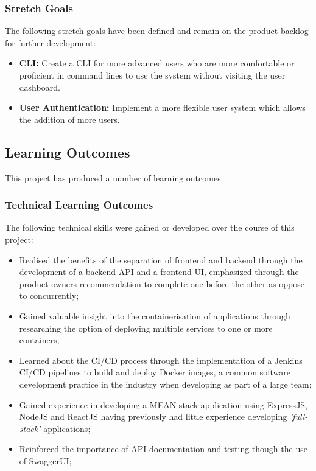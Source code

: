   \subsubsection{Stretch Goals}
  The following stretch goals have been defined and remain on the product backlog for further development:
  
  \begin{itemize}
    \item \textbf{CLI:} Create a CLI for more advanced users who are more comfortable or proficient in command lines to use the system without visiting the user dashboard.
    \item \textbf{User Authentication: } Implement a more flexible user system which allows the addition of more users.
  \end{itemize}
  

	\subsection{Learning Outcomes}
  This project has produced a number of learning outcomes.
  
  \subsubsection{Technical Learning Outcomes}
  The following technical skills were gained or developed over the course of this project:
  
  \begin{itemize}
    \item Realised the benefits of the separation of frontend and backend through the development of a backend API and a frontend UI, emphasized through the product owners recommendation to complete one before the other as oppose to concurrently;
    \item Gained valuable insight into the containerisation of applications through researching the option of deploying multiple services to one or more containers;
    \item Learned about the CI/CD process through the implementation of a Jenkins CI/CD pipelines to build and deploy Docker images, a common software development practice in the industry when developing as part of a large team;
    \item Gained experience in developing a MEAN-stack application using ExpressJS, NodeJS and ReactJS having previously had little experience developing \textit{'full-stack'} applications;
    \item Reinforced the importance of API documentation and testing though the use of SwaggerUI;
  \end{itemize}
  
